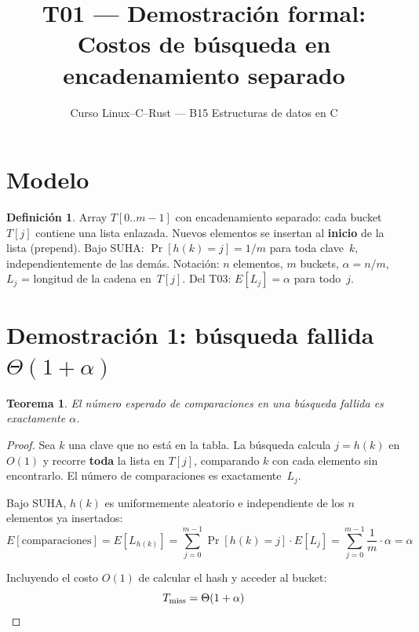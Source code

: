\documentclass[11pt, letterpaper]{article}
\title{%
  T01 --- Demostración formal:\\[4pt]
  Costos de búsqueda en encadenamiento separado
}
\author{Curso Linux--C--Rust --- B15 Estructuras de datos en C}
\date{}
\theoremstyle{definition}
\newtheorem{definition}{Definición}[section]
\theoremstyle{plain}
\newtheorem{theorem}{Teorema}[section]
\theoremstyle{remark}
\begin{document}
\maketitle
\tableofcontents

\section{Modelo}

\begin{definition}
Array $T[0..m{-}1]$ con encadenamiento separado: cada bucket $T[j]$
contiene una lista enlazada. Nuevos elementos se insertan al
\textbf{inicio} de la lista (prepend). Bajo SUHA:
$\Pr[h(k) = j] = 1/m$ para toda clave~$k$, independientemente de las
demás. Notación: $n$ elementos, $m$ buckets,
$\alpha = n/m$, $L_j$ = longitud de la cadena en~$T[j]$.
Del T03: $E[L_j] = \alpha$ para todo~$j$.
\end{definition}

\section{Demostración 1: búsqueda fallida
  \texorpdfstring{$\Theta(1 + \alpha)$}{Theta(1 + alpha)}}

\begin{theorem}\label{thm:miss}
El número esperado de comparaciones en una búsqueda fallida es
exactamente $\alpha$.
\end{theorem}

\begin{proof}
Sea $k$ una clave que no está en la tabla. La búsqueda calcula
$j = h(k)$ en $O(1)$ y recorre \textbf{toda} la lista en $T[j]$,
comparando $k$ con cada elemento sin encontrarlo. El número de
comparaciones es exactamente~$L_j$.

Bajo SUHA, $h(k)$ es uniformemente aleatorio e independiente de los
$n$ elementos ya insertados:
\[
  E[\text{comparaciones}]
  = E[L_{h(k)}]
  = \sum_{j=0}^{m-1} \Pr[h(k) = j] \cdot E[L_j]
  = \sum_{j=0}^{m-1} \frac{1}{m} \cdot \alpha
  = \alpha
\]

Incluyendo el costo $O(1)$ de calcular el hash y acceder al bucket:
\[
  T_{\text{miss}} = \Theta(1 + \alpha) \qedhere
\]
\end{proof}
\end{document}
